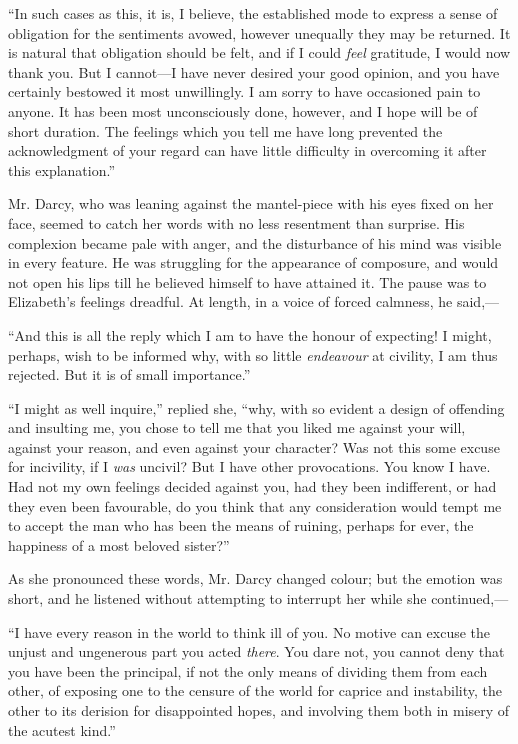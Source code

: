 \documentclass[12pt]{book}
\begin{document}
``In such cases as this, it is, I believe, the established mode to express a sense of obligation for the sentiments avowed, however unequally they may be returned. It is natural that obligation should be felt, and if I could \textit{feel} gratitude, I would now thank you. But I cannot---I have never desired your good opinion, and you have certainly bestowed it most unwillingly. I am sorry to have occasioned pain to anyone. It has been most unconsciously done, however, and I hope will be of short duration. The feelings which you tell me have long prevented the acknowledgment of your regard can have little difficulty in overcoming it after this explanation.''

Mr. Darcy, who was leaning against the mantel-piece with his eyes fixed on her face, seemed to catch her words with no less resentment than surprise. His complexion became pale with anger, and the disturbance of his mind was visible in every feature. He was struggling for the appearance of composure, and would not open his lips till he believed himself to have attained it. The pause was to Elizabeth's feelings dreadful. At length, in a voice of forced calmness, he said,---

``And this is all the reply which I am to have the honour of expecting! I might, perhaps, wish to be informed why, with so little \textit{endeavour} at civility, I am thus rejected. But it is of small importance.''

``I might as well inquire,'' replied she, ``why, with so evident a design of offending and insulting me, you chose to tell me that you liked me against your will, against your reason, and even against your character? Was not this some excuse for incivility, if I \textit{was} uncivil? But I have other provocations. You know I have. Had not my own feelings decided against you, had they been indifferent, or had they even been favourable, do you think that any consideration would tempt me to accept the man who has been the means of ruining, perhaps for ever, the happiness of a most beloved sister?''

As she pronounced these words, Mr. Darcy changed colour; but the emotion was short, and he listened without attempting to interrupt her while she continued,---

``I have every reason in the world to think ill of you. No motive can excuse the unjust and ungenerous part you acted \textit{there}. You dare not, you cannot deny that you have been the principal, if not the only means of dividing them from each other, of exposing one to the censure of the world for caprice and instability, the other to its derision for disappointed hopes, and involving them both in misery of the acutest kind.''
\end{document}
